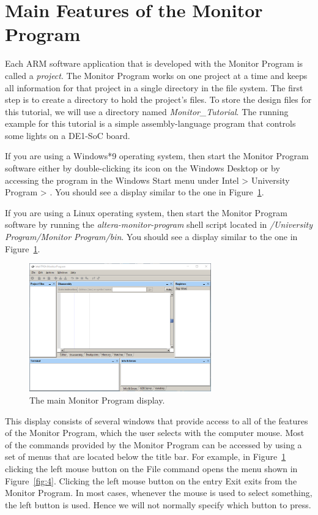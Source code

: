 \documentclass[11pt, twoside, pdftex]{article}
\begin{document}
\section{Main Features of the Monitor Program}
\label{sec:3}

Each ARM software application that is developed with the Monitor Program is called a {\it project}. 
The Monitor Program works on one project at a time and keeps all information for that project in a single directory in the file
system. The first step is to create a directory to hold the project's files. To store the design files for this tutorial, 
we will use a directory named {\it Monitor\_Tutorial}. 
The running example for this tutorial is a simple 
assembly-language program that controls some lights on a 
DE1-SoC board.

If you are using a Windows*9 operating system, then
start the Monitor Program software either by double-clicking its
icon on the Windows Desktop or by accessing the program in the
{\sf Windows Start} menu under 
{\sf Intel > University Program > \productNameMed{}}. 
You should see a display similar to the one in Figure~\ref{fig:3}.

If you are using a Linux operating system, then
start the Monitor Program software by running the
{\it altera-monitor-program} shell script located in
{\it <path to Intel software>/University Program/Monitor Program/bin}.
You should see a display similar to the one in Figure~\ref{fig:3}.

\begin{figure}[H]
   \begin{center}
      \includegraphics[width=0.7\textwidth]{screenshots/figure3.png}
   \end{center}
   \caption{The main Monitor Program display.}
	 \label{fig:3}
\end{figure}

This display consists of several windows that provide access to all of the features of the Monitor Program, which the user
selects with the computer mouse. Most of the commands 
provided by the Monitor Program can be accessed by using a set of
menus that are located below the title bar. For example, in
Figure~\ref{fig:3} clicking the left mouse button on
the {\sf File} command opens the menu shown in 
Figure~\ref{fig:4}. Clicking the left mouse 
button on the entry {\sf Exit} exits from the Monitor Program.  In most cases, whenever the mouse is used to select something,
the left button is used. Hence we will not normally specify which 
button to press. 
\end{document}
